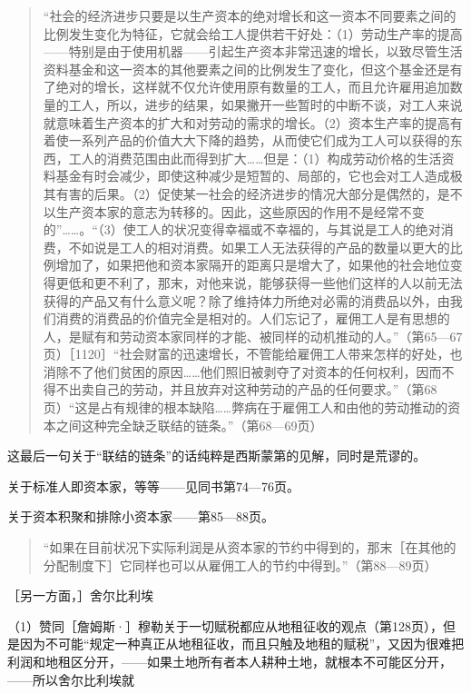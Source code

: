 \begin{quote}{“社会的经济进步只要是以生产资本的绝对增长和这一资本不同要素之间的比例发生变化为特征，它就会给工人提供若干好处：（1）劳动生产率的提高——特别是由于使用机器——引起生产资本非常迅速的增长，以致尽管生活资料基金和这一资本的其他要素之间的比例发生了变化，但这个基金还是有了绝对的增长，这样就不仅允许使用原有数量的工人，而且允许雇用追加数量的工人，所以，进步的结果，如果撇开一些暂时的中断不谈，对工人来说就意味着生产资本的扩大和对劳动的需求的增长。（2）资本生产率的提高有着使一系列产品的价值大大下降的趋势，从而使它们成为工人可以获得的东西，工人的消费范围由此而得到扩大……但是：（1）构成劳动价格的生活资料基金有时会减少，即使这种减少是短暂的、局部的，它也会对工人造成极其有害的后果。（2）促使某一社会的经济进步的情况大部分是偶然的，是不以生产资本家的意志为转移的。因此，这些原因的作用不是经常不变的”……。“（3）使工人的状况变得幸福或不幸福的，与其说是工人的绝对消费，不如说是工人的相对消费。如果工人无法获得的产品的数量以更大的比例增加了，如果把他和资本家隔开的距离只是增大了，如果他的社会地位变得更低和更不利了，那末，对他来说，能够获得一些他们这样的人以前无法获得的产品又有什么意义呢？除了维持体力所绝对必需的消费品以外，由我们消费的消费品的价值完全是相对的。人们忘记了，雇佣工人是有思想的人，是赋有和劳动资本家同样的才能、被同样的动机推动的人。”（第65—67页）［1120］“社会财富的迅速增长，不管能给雇佣工人带来怎样的好处，也消除不了他们贫困的原因……他们照旧被剥夺了对资本的任何权利，因而不得不出卖自己的劳动，并且放弃对这种劳动的产品的任何要求。”（第68页）“这是占有规律的根本缺陷……弊病在于雇佣工人和由他的劳动推动的资本之间这种完全缺乏联结的链条。”（第68—69页）}\end{quote}

这最后一句关于“联结的链条”的话纯粹是西斯蒙第的见解，同时是荒谬的。

关于标准人即资本家，等等——见同书第74—76页。

关于资本积聚和排除小资本家——第85—88页。

\begin{quote}{“如果在目前状况下实际利润是从资本家的节约中得到的，那末［在其他的分配制度下］它同样也可以从雇佣工人的节约中得到。”（第88—89页）}\end{quote}

［另一方面，］舍尔比利埃

（1）赞同［詹姆斯·］穆勒关于一切赋税都应从地租征收的观点（第128页），但是因为不可能“规定一种真正从地租征收，而且只触及地租的赋税”，又因为很难把利润和地租区分开，——如果土地所有者本人耕种土地，就根本不可能区分开，——所以舍尔比利埃就

